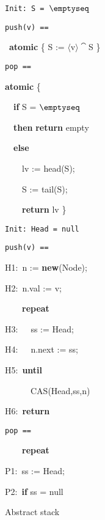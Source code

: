 \documentclass[11pt]{llncs}
\begin{document}
\begin{figure}[t]
\begin{minipage}[b]{0.31\columnwidth}
    {\tt \small Init: S = $\emptyseq$}\smallskip

    {\tt \small push(v) == 
      
      \ \textbf{atomic} \{ S := $\langle$v$\rangle \cat$S \}}\smallskip

    {\tt \small pop ==
      
      \textbf{atomic} \{ 
      
      \ \ \textbf{if} S = $\emptyseq$ 
      
      \ \ \textbf{then} \textbf{return} empty
      
      \ \ \textbf{else} 
      
      \ \ \ \ lv := head(S); 

      \ \ \ \ S := tail(S);

      \ \ \ \ \textbf{return} lv 
       \}
    }
    \vspace{-2mm}
    \caption{Abstract stack}
    \label{fig:Abstract-TS}
  \end{minipage}
  \hfill 
  \begin{minipage}[b]{0.62\columnwidth}
    \smallskip
    
    {\tt \small Init: Head = null}\smallskip

    \begin{minipage}[t]{0.46\columnwidth}
      \tt \small push(v) ==
      
      H1:\      n := \textbf{new}(Node);
      
       H2:\ 
      n.val := v;
      
      \ \ \ \ \textbf{repeat}
      
       H3:\ 
      \ \ ss := Head;
      
       H4:\ 
      \ \ n.next := ss;
      
       H5:\ 
      \textbf{until} 

      \ \ \ \ \ \ CAS(Head,ss,n)
      
       H6:\ 
      \textbf{return}
    \end{minipage}
    \hfill
    \begin{minipage}[t]{0.49\columnwidth}
      \tt \small pop ==
      
       \ \ \ \
      \textbf{repeat }
      
       P1:\ ss := Head;
      
       P2:\ \textbf{if} ss = null 
      

\end{minipage}
\end{minipage}
\end{figure}
\end{document}
